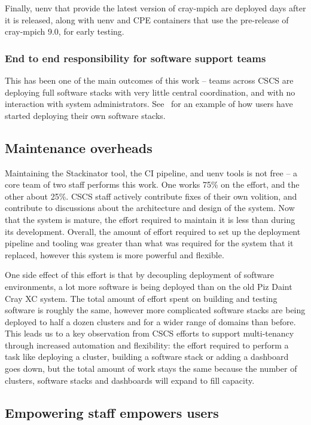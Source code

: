 Finally, uenv that provide the latest version of cray-mpich are deployed days after it is released, along with uenv and CPE containers that use the pre-release of cray-mpich 9.0, for early testing.

\subsubsection{End to end responsibility for software support teams}

This has been one of the main outcomes of this work -- teams across CSCS are deploying full software stacks with very little central coordination, and with no interaction with system administrators.
See~ for an example of how users have started deploying their own software stacks.

\subsection{Maintenance overheads}
\label{sec:discuss-staff}

Maintaining the Stackinator tool, the CI pipeline,  and uenv tools is not free -- a core team of two staff performs this work.
One works 75\% on the effort, and the other about 25\%.
CSCS staff actively contribute fixes of their own volition, and contribute to discussions about the architecture and design of the system.
Now that the system is mature, the effort required to maintain it is less than during its development.
Overall, the amount of effort required to set up the deployment pipeline and tooling was greater than what was required for the system that it replaced, however this system is more powerful and flexible.

One side effect of this effort is that by decoupling deployment of software environments, a lot more software is being deployed than on the old Piz Daint Cray XC system.
The total amount of effort spent on building and testing software is roughly the same, however more complicated software stacks are being deployed to half a dozen clusters and for a wider range of domains than before.
This leads us to a key observation from CSCS efforts to support multi-tenancy through increased automation and flexibility: the effort required to perform a task like deploying a cluster, building a software stack or adding a dashboard goes down, but the total amount of work stays the same because the number of clusters, software stacks and dashboards will expand to fill capacity.

\subsection{Empowering staff empowers users}
\label{sec:discuss-wc}

